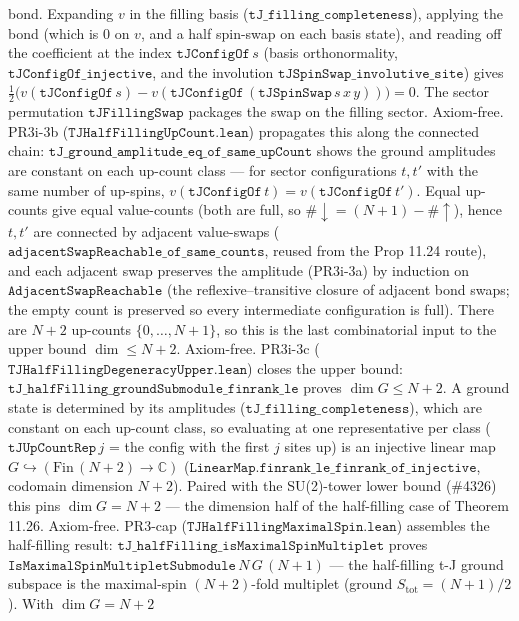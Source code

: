 \documentclass[a4paper,11pt]{article}
\begin{document}
bond.  Expanding $v$ in the filling basis ($\texttt{tJ\_filling\_completeness}$), applying the bond
(which is $0$ on $v$, and a half spin-swap on each basis state), and reading off the coefficient at
the index $\texttt{tJConfigOf}\,s$ (basis orthonormality, $\texttt{tJConfigOf\_injective}$, and the
involution $\texttt{tJSpinSwap\_involutive\_site}$) gives
$\tfrac12\big(v(\texttt{tJConfigOf}\,s)-v(\texttt{tJConfigOf}\,(\texttt{tJSpinSwap}\,s\,x\,y))\big)=0$.
The sector permutation $\texttt{tJFillingSwap}$ packages the swap on the filling sector.  Axiom-free.
PR3i-3b ($\texttt{TJHalfFillingUpCount.lean}$) propagates this along the connected chain:
$\texttt{tJ\_ground\_amplitude\_eq\_of\_same\_upCount}$ shows the ground amplitudes are constant on
each up-count class --- for sector configurations $t,t'$ with the same number of up-spins,
$v(\texttt{tJConfigOf}\,t)=v(\texttt{tJConfigOf}\,t')$.  Equal up-counts give equal value-counts
(both are full, so $\#\!\downarrow = (N{+}1)-\#\!\uparrow$), hence $t,t'$ are connected by adjacent
value-swaps ($\texttt{adjacentSwapReachable\_of\_same\_counts}$, reused from the Prop 11.24 route),
and each adjacent swap preserves the amplitude (PR3i-3a) by induction on
$\texttt{AdjacentSwapReachable}$ (the reflexive--transitive closure of adjacent bond swaps; the empty
count is preserved so every intermediate configuration is full).  There are $N{+}2$ up-counts
$\{0,\dots,N{+}1\}$, so this is the last combinatorial input to the upper bound
$\dim\le N{+}2$.  Axiom-free.  PR3i-3c ($\texttt{TJHalfFillingDegeneracyUpper.lean}$) closes the upper
bound: $\texttt{tJ\_halfFilling\_groundSubmodule\_finrank\_le}$ proves $\dim G\le N{+}2$.  A ground
state is determined by its amplitudes ($\texttt{tJ\_filling\_completeness}$), which are constant on
each up-count class, so evaluating at one representative per class ($\texttt{tJUpCountRep}\,j$ = the
config with the first $j$ sites up) is an injective linear map $G\hookrightarrow(\mathrm{Fin}\,(N{+}2)\to\mathbb C)$
($\texttt{LinearMap.finrank\_le\_finrank\_of\_injective}$, codomain dimension $N{+}2$).  Paired with the
SU(2)-tower lower bound (\#4326) this pins $\dim G=N{+}2$ --- the dimension half of the half-filling
case of Theorem 11.26.  Axiom-free.  PR3-cap ($\texttt{TJHalfFillingMaximalSpin.lean}$) assembles the
half-filling result: $\texttt{tJ\_halfFilling\_isMaximalSpinMultiplet}$ proves
$\texttt{IsMaximalSpinMultipletSubmodule}\,N\,G\,(N{+}1)$ --- the half-filling t-J ground subspace is
the maximal-spin $(N{+}2)$-fold multiplet (ground $S_{\mathrm{tot}}=(N{+}1)/2$).  With $\dim G=N{+}2$
\end{document}
